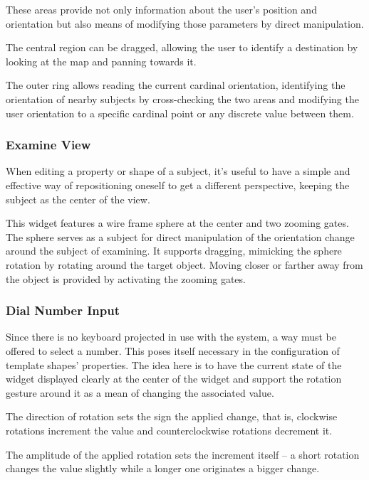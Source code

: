 These areas provide not only information about the user's position and orientation but also means of
modifying those parameters by direct manipulation.


The central region can be dragged, allowing the user to identify a destination by looking at the map and
panning towards it.

The outer ring allows reading the current cardinal orientation,
identifying the orientation of nearby subjects by cross-checking the two areas and
modifying the user orientation to a specific cardinal point or any discrete value between them.


\subsubsection{Examine View}

When editing a property or shape of a subject, it's useful to have a simple and effective way
of repositioning oneself to get a different perspective, keeping the subject as the center of the view.


This widget features a wire frame sphere at the center and two zooming gates.
The sphere serves as a subject for direct manipulation of the orientation change around the subject of examining.
It supports dragging, mimicking the sphere rotation by rotating around the target object.
Moving closer or farther away from the object is provided by activating the zooming gates.


\subsubsection{Dial Number Input}

Since there is no keyboard projected in use with the system, a way must be offered to select a number.
This poses itself necessary in the configuration of template shapes' properties.
The idea here is to have the current state of the widget displayed clearly at the center of the widget
and support the rotation gesture around it as a mean of changing the associated value.


The direction of rotation sets the sign the applied change, that is, clockwise rotations increment
the value and counterclockwise rotations decrement it.

The amplitude of the applied rotation sets the increment itself -- a short rotation changes the value
slightly while a longer one originates a bigger change.

